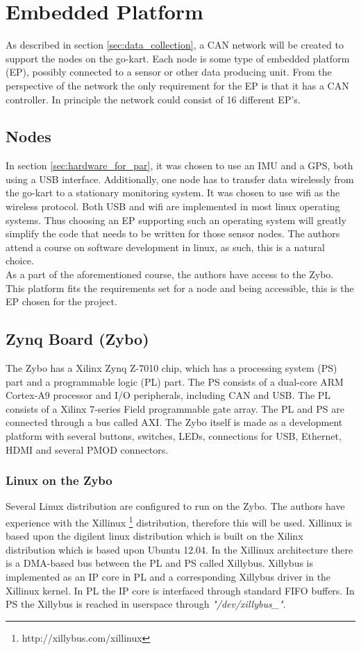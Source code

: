 
\section{Embedded Platform}
As described in section \ref{sec:data_collection}, a CAN network will be created to support the nodes on the go-kart.
Each node is some type of embedded platform (EP), possibly connected to a sensor or other data producing unit.
From the perspective of the network the only requirement for the EP is that it has a CAN controller.
In principle the network could consist of 16 different EP's.
\subsection{Nodes}
In section \ref{sec:hardware_for_par}, it was chosen to use an IMU and a GPS, both using a USB interface.
Additionally, one node has to transfer data wirelessly from the go-kart to a stationary monitoring system.
It was chosen to use wifi as the wireless protocol.
Both USB and wifi are implemented in most linux operating systems.
Thus choosing an EP supporting such an operating system will greatly simplify the code that needs to be written for those sensor nodes.
The authors attend a course on software development in linux, as such, this is a natural choice.
\\
As a part of the aforementioned course, the authors have access to the Zybo.
This platform fits the requirements set for a node and being accessible, this is the EP chosen for the project.

\subsection{Zynq Board (Zybo)}
The Zybo has a Xilinx Zynq Z-7010 chip, which has a processing system (PS) part and a programmable logic (PL) part.
The PS consists of a dual-core ARM Cortex-A9 processor and I/O peripherals, including CAN and USB.
The PL consists of a Xilinx 7-series Field programmable gate array. 
The PL and PS are connected through a bus called AXI.
The Zybo itself is made as a development platform with several buttons, switches, LEDs, connections for USB, Ethernet, HDMI and several PMOD connectors.
\subsubsection{Linux on the Zybo}
Several Linux distribution are configured to run on the Zybo. 
The authors have experience with the Xillinux \footnote{http://xillybus.com/xillinux} distribution, therefore this will be used.
Xillinux is based upon the digilent linux distribution which is built on the Xilinx distribution which is based upon Ubuntu 12.04.
In the Xillinux architecture there is a DMA-based bus between the PL and PS called Xillybus.
Xillybus is implemented as an IP core in PL and a corresponding Xillybus driver in the Xillinux kernel.
In PL the IP core is interfaced through standard FIFO buffers.
In PS the Xillybus is reached in userspace through \textit{"/dev/xillybus\_<bus-name>"}.

